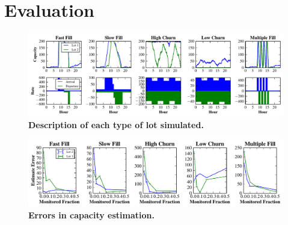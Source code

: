 \section{Evaluation}
\label{sec-evaluation}

\begin{figure}
\centering
\includegraphics[width=\textwidth]{./simulator/figures/lots.pdf}

\caption{\textbf{Description of each type of lot simulated.} }

\label{fig-lotsdescription}
\end{figure}

\begin{figure}
\centering
\includegraphics[width=\textwidth]{./simulator/figures/capacity_experiment.pdf}

\caption{\textbf{Errors in capacity estimation.} }

\label{fig-lotsdescription}
\end{figure}
